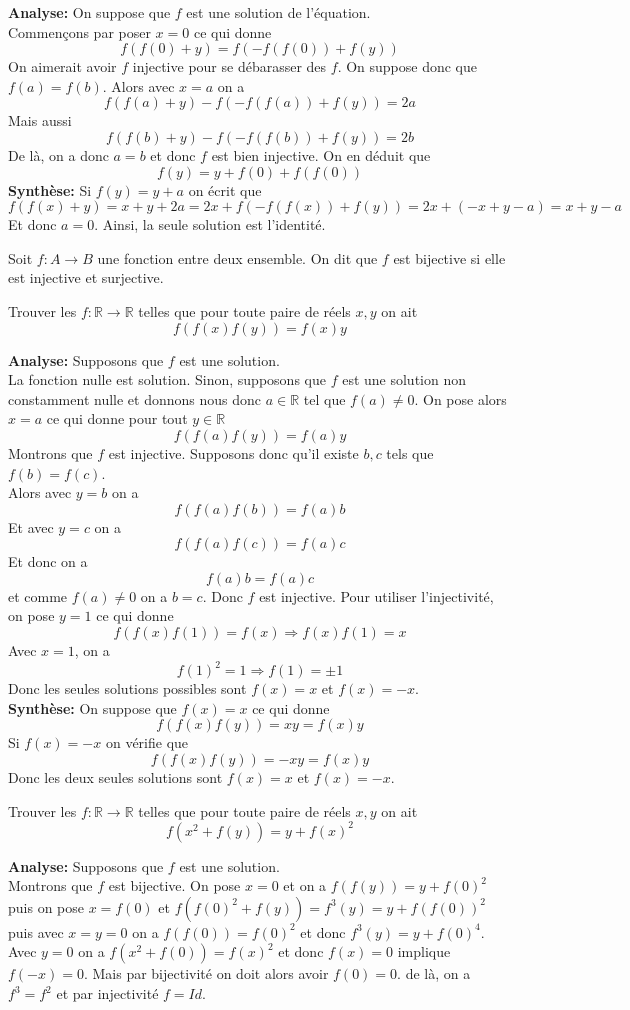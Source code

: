 \begin{preuve}
\textbf{Analyse:} On suppose que $f$ est une solution de l'équation.
\\
Commençons par poser $x=0$ ce qui donne 
$$f(f(0)+y)=f(-f(f(0))+f(y)) $$
On aimerait avoir $f$ injective pour se débarasser des $f$. On suppose donc que $f(a)=f(b)$. Alors avec $x=a$ on a
$$f(f(a)+y)-f(-f(f(a))+f(y))=2a $$
Mais aussi
$$f(f(b)+y)-f(-f(f(b))+f(y))=2b $$
De là, on a donc $a=b$ et donc $f$ est bien injective. On en déduit que 
$$f(y)=y+f(0)+f(f(0)) $$
\textbf{Synthèse:} Si $f(y)=y+a$ on écrit que 
$$f(f(x)+y)=x+y+2a=2x+f(-f(f(x))+f(y))=2x+(-x+y-a)=x+y-a $$
Et donc $a=0$. Ainsi, la seule solution est l'identité.
\end{preuve}
\begin{dfn}[Bijectivité]
Soit $f:A\to B$ une fonction entre deux ensemble. On dit que $f$ est bijective si elle est injective et surjective.
\end{dfn}
\begin{exo}[F-M]
Trouver les $f:\mathbb{R}\to \mathbb{R}$ telles que pour toute paire de réels $x,y$ on ait $$f(f(x)f(y))=f(x)y $$

\end{exo}
\begin{preuve}
\textbf{Analyse:} Supposons que $f$ est une solution.
\\
La fonction nulle est solution. Sinon, supposons que $f$ est une solution non constamment nulle et donnons nous donc $a\in \mathbb{R}$ tel que $f(a)\neq 0$. On pose alors $x=a$ ce qui donne pour tout $y\in \mathbb{R}$
$$f(f(a)f(y))=f(a)y $$
Montrons que $f$ est injective. Supposons donc qu'il existe $b,c$ tels que $f(b)=f(c)$.
\\
Alors avec $y=b$ on a 
$$f(f(a)f(b))=f(a)b $$
Et avec $y=c$ on a 
$$f(f(a)f(c))=f(a)c $$
Et donc on a 
$$f(a)b=f(a)c $$ et comme $f(a)\neq 0$ on a $b= c$. Donc $f$ est injective.
Pour utiliser l'injectivité, on pose $y=1$ ce qui donne 
$$f(f(x)f(1))=f(x)\Rightarrow f(x)f(1)=x $$
Avec $x=1$, on a$$ f(1)^2=1\Rightarrow f(1)=\pm 1$$
Donc les seules solutions possibles sont $f(x)=x$ et $f(x)=-x$.
\\
\textbf{Synthèse:} On suppose que $f(x)=x$ ce qui donne 
$$f(f(x)f(y))=xy=f(x)y $$
Si $f(x)=-x$ on vérifie que
$$f(f(x)f(y))=-xy=f(x)y $$
Donc les deux seules solutions sont $f(x)=x$ et $f(x)=-x$.
\end{preuve}
\begin{exo}[M]
Trouver les $f:\mathbb{R}\to \mathbb{R}$ telles que pour toute paire de réels $x,y$ on ait $$f(x^2+f(y))=y+f(x)^2$$
\end{exo}
\begin{preuve}
\textbf{Analyse:} Supposons que $f$ est une solution.
\\
Montrons que $f$ est bijective. On pose $x=0$ et on a $f(f(y))=y+f(0)^2$ puis on pose $x=f(0)$ et $f(f(0)^2+f(y))=f^3(y)=y+f(f(0))^2$ puis avec $x=y=0$ on a $f(f(0))=f(0)^2$ et donc $f^3(y)=y+f(0)^4$. Avec $y=0$ on a $f(x^2+f(0))=f(x)^2$ et donc $f(x)=0$ implique $f(-x)=0$. Mais par bijectivité on doit alors avoir $f(0)=0$. de là, on a $f^3=f^2$ et par injectivité $f=Id$.
\end{preuve}
\\

